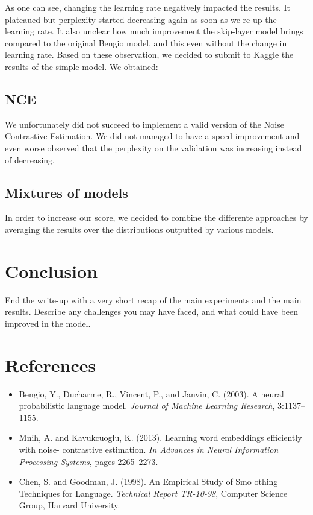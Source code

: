 \documentclass[11pt]{article}
\begin{document}
\noindent As one can see, changing the learning rate negatively impacted the results. It plateaued but perplexity started decreasing again as soon as we re-up the learning rate. It also unclear how much improvement the skip-layer model brings compared to the original Bengio model, and this even without the change in learning rate. Based on these observation, we decided to submit to Kaggle the results of the simple model. We obtained:

\subsection{NCE}

We unfortunately did not succeed to implement a valid version of the Noise Contrastive Estimation. We did not managed to have a speed improvement and even worse observed that the perplexity on the validation was increasing instead of decreasing.

\subsection{Mixtures of models}
In order to increase our score, we decided to combine the differente approaches by averaging the results over the distributions outputted by various models.

\section{Conclusion}

End the write-up with a very short recap of the main experiments and the main results. Describe any challenges you may have faced, and what could have been improved in the model.

\section{References}
\begin{itemize}
\item Bengio, Y., Ducharme, R., Vincent, P., and Janvin, C. (2003). A neural probabilistic language model. \emph{Journal of Machine Learning Research}, 3:1137–1155.

\item Mnih, A. and Kavukcuoglu, K. (2013). Learning word embeddings efficiently with noise- contrastive estimation. \emph{In Advances in Neural Information Processing Systems}, pages 2265–2273.

\item Chen, S. and Goodman, J. (1998). An Empirical Study of Smo othing Techniques for Language. \emph{Technical Report TR-10-98}, Computer Science Group, Harvard University.
\end{itemize}
\end{document}

